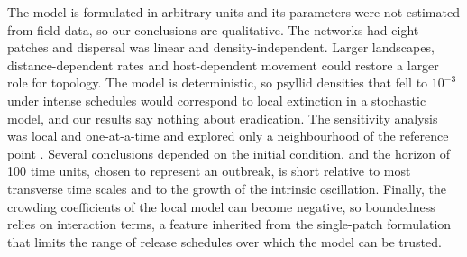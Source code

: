 The model is formulated in arbitrary units and its parameters were not estimated from field data, so our conclusions are qualitative. The networks had eight patches and dispersal was linear and density-independent. Larger landscapes, distance-dependent rates and host-dependent movement \citep{comins1992,RefugeConnectivity2022} could restore a larger role for topology. The model is deterministic, so psyllid densities that fell to $10^{-3}$ under intense schedules would correspond to local extinction in a stochastic model, and our results say nothing about eradication. The sensitivity analysis was local and one-at-a-time and explored only a neighbourhood of the reference point \citep{saltelli2019}. Several conclusions depended on the initial condition, and the horizon of 100 time units, chosen to represent an outbreak, is short relative to most transverse time scales and to the growth of the intrinsic oscillation. Finally, the crowding coefficients of the local model can become negative, so boundedness relies on interaction terms, a feature inherited from the single-patch formulation \citep{RodriguezFalcon2026} that limits the range of release schedules over which the model can be trusted.
